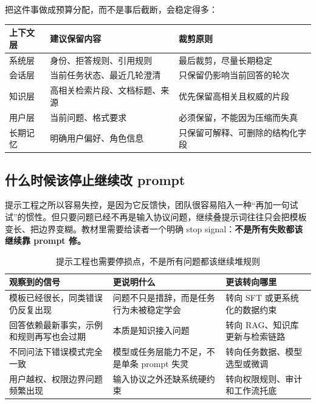 把这件事做成预算分配，而不是事后截断，会稳定得多：

\begin{longtable}{>{\raggedright\arraybackslash}p{3cm}>{\raggedright\arraybackslash}p{4cm}>{\raggedright\arraybackslash}p{6.2cm}}
\toprule
\textbf{上下文层} & \textbf{建议保留内容} & \textbf{裁剪原则} \\
\midrule
系统层 & 身份、拒答规则、引用规则 & 最后裁剪，尽量长期稳定 \\
会话层 & 当前任务状态、最近几轮澄清 & 只保留仍影响当前回答的轮次 \\
知识层 & 高相关检索片段、文档标题、来源 & 优先保留高相关且权威的片段 \\
用户层 & 当前问题、格式要求 & 必须保留，不能因为压缩而失真 \\
长期记忆 & 明确用户偏好、角色信息 & 只保留可解释、可删除的结构化字段 \\
\bottomrule
\end{longtable}

\subsection{什么时候该停止继续改 prompt}
提示工程之所以容易失控，是因为它反馈快，团队很容易陷入一种“再加一句试试”的惯性。但只要问题已经不再是输入协议问题，继续叠提示词往往只会把模板变长、把边界变糊。教材里需要给读者一个明确 stop signal：\textbf{不是所有失败都该继续靠 prompt 修。}

\begin{table}[H]
\centering
\small
\begin{tabularx}{\textwidth}{>{\raggedright\arraybackslash}p{3.2cm}>{\raggedright\arraybackslash}p{3.3cm}>{\raggedright\arraybackslash}X}
\toprule
\textbf{观察到的信号} & \textbf{更说明什么} & \textbf{更该转向哪里} \\
\midrule
模板已经很长，同类错误仍反复出现 & 问题不只是措辞，而是任务行为未被稳定学会 & 转向 SFT 或更系统化的数据约束 \\
回答依赖最新事实，示例和规则再写也会过期 & 本质是知识接入问题 & 转向 RAG、知识库更新与检索链路 \\
不同问法下错误模式完全一致 & 模型或任务层能力不足，不是单条 prompt 失灵 & 转向任务数据、模型选型或微调 \\
用户越权、权限边界问题频繁出现 & 输入协议之外还缺系统硬约束 & 转向权限规则、审计和工作流托底 \\
\bottomrule
\end{tabularx}
\caption{提示工程也需要停损点，不是所有问题都该继续堆规则}
\label{tab:when-stop-prompting}
\end{table}


